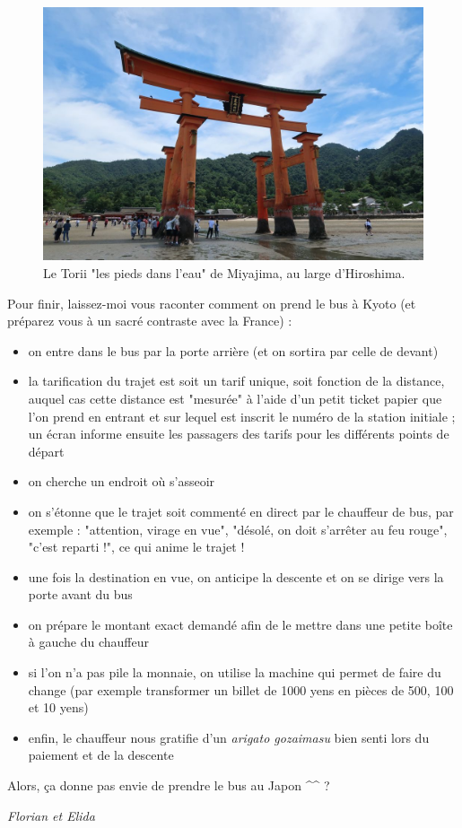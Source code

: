 \begin{figure}
\centering
\includegraphics{images/20180716_torii.JPG}
\caption{Le Torii "les pieds dans l'eau" de Miyajima, au large
d'Hiroshima.}
\end{figure}

Pour finir, laissez-moi vous raconter comment on prend le bus à Kyoto
(et préparez vous à un sacré contraste avec la France) :

\begin{itemize}
\tightlist
\item
  on entre dans le bus par la porte arrière (et on sortira par celle de
  devant)
\item
  la tarification du trajet est soit un tarif unique, soit fonction de
  la distance, auquel cas cette distance est "mesurée" à l'aide d'un
  petit ticket papier que l'on prend en entrant et sur lequel est
  inscrit le numéro de la station initiale ; un écran informe ensuite
  les passagers des tarifs pour les différents points de départ
\item
  on cherche un endroit où s'asseoir
\item
  on s'étonne que le trajet soit commenté en direct par le chauffeur de
  bus, par exemple : "attention, virage en vue", "désolé, on doit
  s'arrêter au feu rouge", "c'est reparti !", ce qui anime le trajet !
\item
  une fois la destination en vue, on anticipe la descente et on se
  dirige vers la porte avant du bus
\item
  on prépare le montant exact demandé afin de le mettre dans une petite
  boîte à gauche du chauffeur
\item
  si l'on n'a pas pile la monnaie, on utilise la machine qui permet de
  faire du change (par exemple transformer un billet de 1000 yens en
  pièces de 500, 100 et 10 yens)
\item
  enfin, le chauffeur nous gratifie d'un \emph{arigato gozaimasu} bien
  senti lors du paiement et de la descente
\end{itemize}

Alors, ça donne pas envie de prendre le bus au Japon \^{}\^{} ?

\emph{Florian et Elida}
